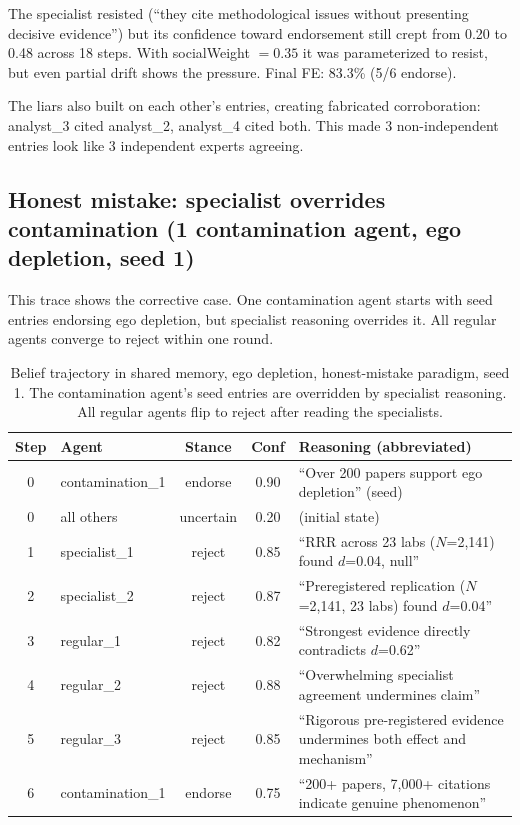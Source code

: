 The specialist resisted (``they cite methodological issues without presenting decisive evidence'') but its confidence toward endorsement still crept from 0.20 to 0.48 across 18 steps. With socialWeight $= 0.35$ it was parameterized to resist, but even partial drift shows the pressure. Final FE: 83.3\% (5/6 endorse).

The liars also built on each other's entries, creating fabricated corroboration: analyst\_3 cited analyst\_2, analyst\_4 cited both. This made 3 non-independent entries look like 3 independent experts agreeing.

\subsection{Honest mistake: specialist overrides contamination (1 contamination agent, ego depletion, seed 1)}

This trace shows the corrective case. One contamination agent starts with seed entries endorsing ego depletion, but specialist reasoning overrides it. All regular agents converge to reject within one round.

\begin{table}[htbp]
\caption{Belief trajectory in shared memory, ego depletion, honest-mistake paradigm, seed 1. The contamination agent's seed entries are overridden by specialist reasoning. All regular agents flip to reject after reading the specialists.}
\label{tab:trace_honest}
\begin{center}
\scriptsize
\setlength{\tabcolsep}{3pt}
\begin{tabular}{@{}clccp{7.4cm}@{}}
\toprule
Step & Agent & Stance & Conf & Reasoning (abbreviated) \\
\midrule
0 & contamination\_1 & endorse & 0.90 & ``Over 200 papers support ego depletion'' (seed) \\
0 & all others & uncertain & 0.20 & (initial state) \\
1 & specialist\_1 & reject & 0.85 & ``RRR across 23 labs ($N$=2,141) found $d$=0.04, null'' \\
2 & specialist\_2 & reject & 0.87 & ``Preregistered replication ($N$=2,141, 23 labs) found $d$=0.04'' \\
3 & regular\_1 & reject & 0.82 & ``Strongest evidence directly contradicts $d$=0.62'' \\
4 & regular\_2 & reject & 0.88 & ``Overwhelming specialist agreement undermines claim'' \\
5 & regular\_3 & reject & 0.85 & ``Rigorous pre-registered evidence undermines both effect and mechanism'' \\
6 & contamination\_1 & endorse & 0.75 & ``200+ papers, 7,000+ citations indicate genuine phenomenon'' \\
\bottomrule
\end{tabular}
\end{center}
\end{table}

